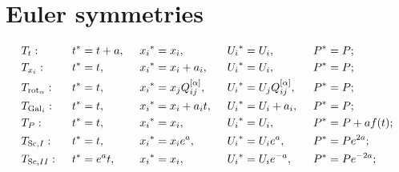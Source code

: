 \documentclass{article}
\begin{document}
\section{Euler symmetries}
\begin{align}
    \label{eq:symmGloUnavgTime}
    & \gloSymmT : \enskip
    &&\tra{t} t + \grp, \enskip
    &&\tra{x_i} x_i, \enskip
    &&\tra{U_i} U_i, \enskip
    &&\tra{P} P;
    \\ 
    \label{eq:symmGloUnavgSpace}
    & \gloSymmX :  \enskip
    &&\tra{t} t, \enskip
    &&\tra{x_i} x_i + \grp_i, \enskip
    &&\tra{U_i} U_i, \enskip
    &&\tra{P} P;
    \\
    \label{eq:symmGloUnavgRot}
    & \gloSymmRot : \enskip
    &&\tra{t} t, \enskip
    &&\tra{x_i} x_j Q_{ij}^{[\alpha]}, \enskip
    &&\tra{U_i} U_j Q_{ij}^{[\alpha]}, \enskip
    &&\tra{P} P;\\
    \label{eq:symmGloUnavgGal}
    & \gloSymmGal : \enskip
    &&\tra{t} t, \enskip
    &&\tra{x_i} x_i + \grp_i t, \enskip
    &&\tra{U_i} {U_i} + \grp_i, \enskip
    &&\tra{P} P;\\
    \label{eq:symmGloUnavgPress}
    & \gloSymmP : \enskip
    &&\tra{t} t, \enskip
    &&\tra{x_i} x_i, \enskip
    &&\tra{U_i} {U_i}, \enskip
    &&\tra{P} P + \grp f(t);\\
    \label{eq:symmGloUnavgScal1}
    & \gloSymmScI : \enskip
    &&\tra{t} t, \enskip
    &&\tra{x_i} x_i e^{\grp}, \enskip
    &&\tra{U_i} {U_i} e^{\grp}, \enskip
    &&\tra{P} P e^{2 \grp};\\
    \label{eq:symmGloUnavgScal2}
    & \gloSymmScII : \enskip
    &&\tra{t} e^{\grp}t, \enskip
    &&\tra{x_i} x_i, \enskip
    &&\tra{U_i} {U_i} e^{-\grp}, \enskip
    &&\tra{P} P e^{-2 \grp};
\end{align}
\end{document}
